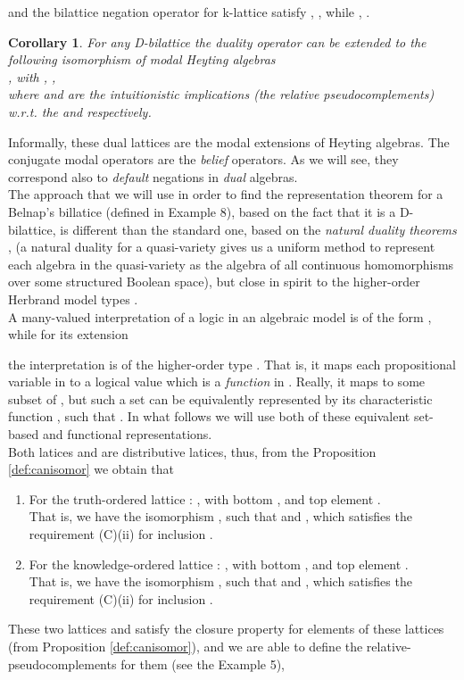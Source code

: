 \documentclass[10pt,twocolumn]{article}
\newtheorem{coro}{Corollary}
\begin{document}
and   the bilattice negation operator for k-lattice satisfy , , while , .
\begin{coro} \cite{Majk07MV} \label{prop:d-billat}
For any D-bilattice  the duality operator  can be
extended to the following isomorphism of modal Heyting algebras \\
,
with ,  ,\\ where  and
 are the intuitionistic implications (the
relative pseudocomplements) w.r.t. the  and 
respectively.
\end{coro}
Informally, these dual lattices are  the modal extensions of Heyting
algebras. The conjugate modal operators are the \emph{belief}
operators.
As we will see, they correspond also to \emph{default} negations in
\emph{dual}
algebras. \\
The approach that we will use in order to find the representation
theorem for a Belnap's billatice (defined in Example 8),  based on
the fact that it is a D-bilattice, is different than the standard
one, based on the \emph{natural duality theorems} \cite{ClDa98}, (a
natural duality for a quasi-variety gives us a uniform method to
represent each algebra in the quasi-variety as the algebra of all
continuous homomorphisms over some structured Boolean space), but
close in spirit to the higher-order Herbrand model types
\cite{Majk06}.\\ A many-valued interpretation of a logic  in an
algebraic model  is of
the form , while for its extension

the interpretation is of the higher-order type . That is, it maps each
propositional variable in  to a logical value which is a
\emph{function}  in . Really, it maps to some
subset  of , but such a set can be equivalently represented
by its characteristic function , such that . In what follows we will use both
of these
equivalent set-based and functional representations.\\
Both latices  and  are distributive
latices, thus, from the Proposition \ref{def:canisomor} we obtain
that
\begin{enumerate}
  \item For the truth-ordered lattice :
 , with bottom , and top element .\\
That is, we have the isomorphism ,
 such that   and , which satisfies the requirement (C)(ii) for inclusion  .
\item For the knowledge-ordered lattice :
, with bottom , and top element .\\
That is, we have the isomorphism ,
 such that   and , which satisfies the requirement (C)(ii) for inclusion  .
 \end{enumerate}
 These  two lattices  and  satisfy the
 closure property \cite{McTa46} for elements of these lattices (from
 Proposition \ref{def:canisomor}), and we are able to define the
 relative-pseudocomplements for them (see the Example 5),
 
\end{document}
